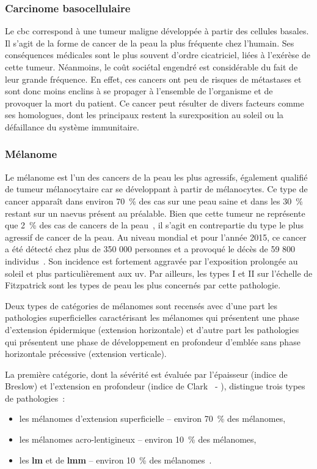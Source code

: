 \subsubsection{Carcinome basocellulaire}	
Le \gls{cbc} correspond à une tumeur maligne développée à partir des cellules basales. Il s’agit de la forme de cancer de la peau la plus fréquente chez l'humain. Ses conséquences médicales sont le plus souvent d'ordre cicatriciel, liées à l'exérèse de cette tumeur. Néanmoins, le coût sociétal engendré est considérable du fait de leur grande fréquence. En effet, ces cancers ont peu de risques de métastases et sont donc moins enclins à se propager à l’ensemble de l’organisme et de provoquer la mort du patient. Ce cancer peut résulter de divers facteurs comme ses homologues, dont les principaux restent la surexposition au soleil ou la défaillance du système immunitaire.\par

\subsubsection{Mélanome}
Le mélanome est l'un des cancers de la peau les plus agressifs, également qualifié de tumeur mélanocytaire car se développant à partir de mélanocytes. Ce type de cancer apparaît dans environ 70~\% des cas sur une peau saine et dans les 30~\% restant sur un naevus présent au préalable. Bien que cette tumeur ne représente que 2~\% des cas de cancers de la peau~\cite{Tortora2012}, il s’agit en contrepartie du type le plus agressif de cancer de la peau. Au niveau mondial et pour l'année 2015, ce cancer a été détecté chez plus de 350 000 personnes et a provoqué le décès de 59 800 individus~\cite{Karimkhani2017}. Son incidence est fortement aggravée par l’exposition prolongée au soleil et plus particulièrement aux \gls{uv}. Par ailleurs, les types I et II sur l’échelle de Fitzpatrick sont les types de peau les plus concernés par cette pathologie.\par

Deux types de catégories de mélanomes sont recensés avec d’une part les pathologies superficielles caractérisant les mélanomes qui présentent une phase d’extension épidermique (extension horizontale) et d'autre part les pathologies qui présentent une phase de développement en profondeur d’emblée sans phase horizontale précessive (extension verticale).\par

La première catégorie, dont la sévérité est évaluée par l'épaisseur (indice de Breslow) et l'extension en profondeur (indice de Clark~\cite{Clark1969} - ), distingue trois types de pathologies~:
\begin{itemize}
    \item les mélanomes d'extension superficielle – environ 70~\% des mélanomes,
    \item les mélanomes acro-lentigineux – environ 10~\% des mélanomes,
    \item les \textbf{\acrlong{lm}} et de \textbf{\acrlong{lmm}} – environ 10~\% des mélanomes~\cite{LeGal2011}.
\end{itemize}

